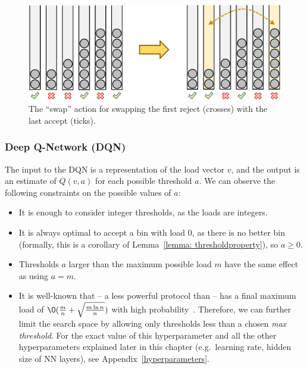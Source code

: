 \begin{figure}
    \centering
    \includegraphics[scale=0.5]{Chapter3/Figs/two_thinning_swap.pdf}
    \caption{The ``swap'' action for \TwoThinning swapping the first reject (crosses) with the last accept (ticks).}
    \label{two-thinning-swap-action}
\end{figure}


\subsubsection*{Deep Q-Network (DQN)} \label{DQN}

The input to the DQN is a representation of the load vector $v$, and the output is an estimate of $Q(v, a)$ for each possible threshold $a$. We can observe the following constraints on the possible values of $a$:

\begin{itemize}
    \item It is enough to consider integer thresholds, as the loads are integers.
    \item It is always optimal to accept a bin with load $0$, as there is no better bin (formally, this is a corollary of Lemma~\ref{lemma: thresholdproperty}), so $a\geq 0$.
    \item Thresholds $a$ larger than the maximum possible load $m$ have the same effect as using $a=m$.
    \item It is well-known that \OneChoice -- a less powerful protocol than \TwoThinning -- has a final maximum load of $\O (\frac{m}{n} + \sqrt{\frac{m\ln n}{n}})$ with high probability~\cite{raab1998onechoice}. Therefore, we can further limit the search space by allowing only thresholds less than a chosen \textit{max threshold}. For the exact value of this hyperparameter and all the other hyperparameters explained later in this chapter (e.g.\ learning rate, hidden size of NN layers), see Appendix~\ref{hyperparameters}.
    
\end{itemize}


